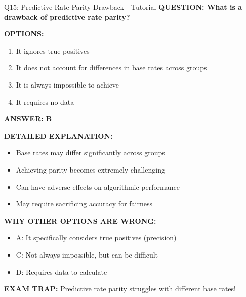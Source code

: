\documentclass[8pt]{beamer}
\begin{document}
	\begin{frame}{Q15: Predictive Rate Parity Drawback - Tutorial}
		\fontsize{6.5}{7.5}\selectfont
		\textbf{QUESTION: What is a drawback of predictive rate parity?}
		
		\vspace{0.1cm}
		\textbf{OPTIONS:}
		\begin{enumerate}
			\item It ignores true positives
			\item It does not account for differences in base rates across groups
			\item It is always impossible to achieve
			\item It requires no data
		\end{enumerate}
		
		\vspace{0.1cm}
		\textcolor{myblue}{\textbf{ANSWER: B}}
		
		\vspace{0.1cm}
		\textbf{DETAILED EXPLANATION:}
		\begin{itemize}
			\item Base rates may differ significantly across groups
			\item Achieving parity becomes extremely challenging
			\item Can have adverse effects on algorithmic performance
			\item May require sacrificing accuracy for fairness
		\end{itemize}
		
		\vspace{0.1cm}
		\textcolor{myred}{\textbf{WHY OTHER OPTIONS ARE WRONG:}}
		\begin{itemize}
			\item \textcolor{myred}{A:} It specifically considers true positives (precision)
			\item \textcolor{myred}{C:} Not always impossible, but can be difficult
			\item \textcolor{myred}{D:} Requires data to calculate
		\end{itemize}
		
		\textcolor{myred}{\textbf{EXAM TRAP:}} Predictive rate parity struggles with \textcolor{myblue}{different base rates}!
	\end{frame}
	
\end{document}
